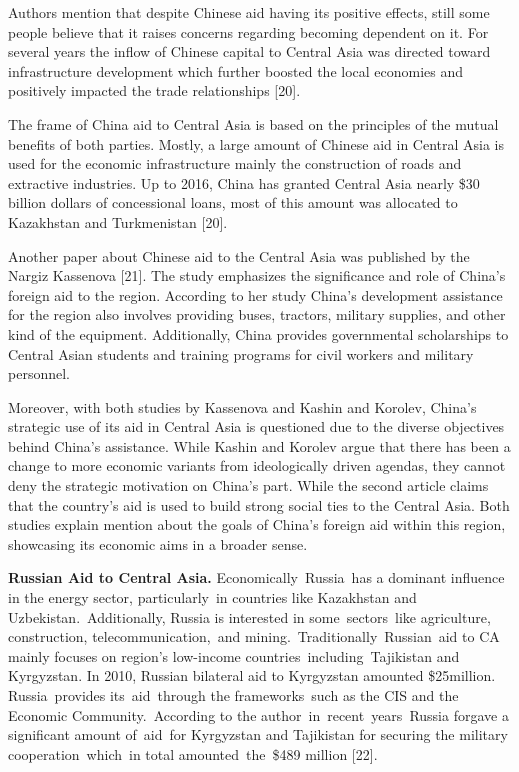 Authors mention that despite Chinese aid having its positive effects,
still some people believe that it raises concerns regarding becoming
dependent on it. For several years the inflow of Chinese capital to
Central Asia was directed toward infrastructure development which
further boosted the local economies and positively impacted the trade
relationships {[}20{]}.

The frame of China aid to Central Asia is based on the principles of the
mutual benefits of both parties. Mostly, a large amount of Chinese aid
in Central Asia is used for the economic infrastructure mainly the
construction of roads and extractive industries. Up to 2016, China has
granted Central Asia nearly \$30 billion dollars of concessional loans,
most of this amount was allocated to Kazakhstan and Turkmenistan
{[}20{]}.

Another paper about Chinese aid to the Central Asia was published by the
Nargiz Kassenova {[}21{]}. The study emphasizes the significance and
role of China's foreign aid to the region. According to her study
China's development assistance for the region also involves providing
buses, tractors, military supplies, and other kind of the equipment.
Additionally, China provides governmental scholarships to Central Asian
students and training programs for civil workers and military personnel.

Moreover, with both studies by Kassenova and Kashin and Korolev, China's
strategic use of its aid in Central Asia is questioned due to the
diverse objectives behind China's assistance. While Kashin and Korolev
argue that there has been a change to more economic variants from
ideologically driven agendas, they cannot deny the strategic motivation
on China's part. While the second article claims that the country's aid
is used to build strong social ties to the Central Asia. Both studies
explain mention about the goals of China's foreign aid within this
region, showcasing its economic aims in a broader sense.

{\bfseries Russian Aid to Central Asia.} Economically~Russia~has a dominant
influence in the energy sector, particularly~in countries like
Kazakhstan and Uzbekistan.~Additionally, Russia is interested in
some~sectors~like agriculture, construction, telecommunication,~and
mining.~Traditionally~Russian~aid to CA mainly focuses on region's
low-income countries~including~Tajikistan and Kyrgyzstan. In 2010,
Russian bilateral aid to Kyrgyzstan amounted \$25million.
Russia~provides its~aid~through the frameworks~such as the CIS and the
Economic Community.~According to the author~in~recent~years~Russia
forgave a significant amount of~aid~for Kyrgyzstan and Tajikistan for
securing the military cooperation~which~in total amounted~the~\$489
million {[}22{]}.

